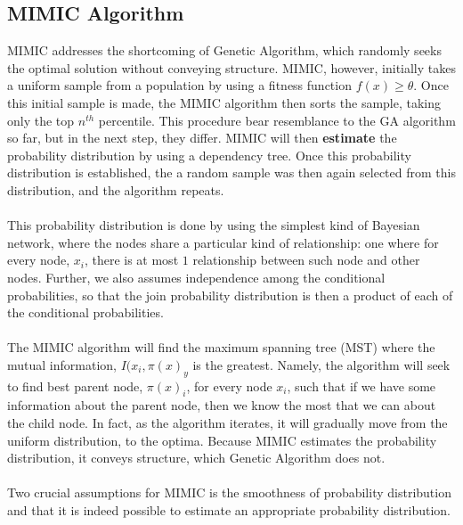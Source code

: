 \documentclass{article}
\begin{document}
\subsection*{MIMIC Algorithm}
MIMIC addresses the shortcoming of Genetic Algorithm, which randomly seeks the optimal solution without conveying structure. MIMIC, however, initially takes a uniform sample from a population by using a fitness function $f(x) \ge \theta$. Once this initial sample is made, the MIMIC algorithm then sorts the sample, taking only the top $n^{th}$ percentile. This procedure bear resemblance to the GA algorithm so far, but in the next step, they differ. MIMIC will then \textbf{estimate} the probability distribution by using a dependency tree. Once this probability distribution is established, the a random sample was then again selected from this distribution, and the algorithm repeats. 

\paragraph{}
This probability distribution is done by using the simplest kind of Bayesian network, where the nodes share a particular kind of relationship: one where for every node, $x_i$, there is at most $1$ relationship between such node and other nodes. Further, we also assumes independence among the conditional probabilities, so that the join probability distribution is then a product of each of the conditional probabilities. 

\paragraph{}
The MIMIC algorithm will find the maximum spanning tree (MST) where the mutual information, $I(x_i, \pi(x)_y$ is the greatest. Namely, the algorithm will seek to find best parent node, $\pi(x)_i$, for every node $x_i$, such that if we have some information about the parent node, then we know the most that we can about the child node. In fact, as the algorithm iterates, it will gradually move from the uniform distribution, to the optima. Because MIMIC estimates the probability distribution, it conveys structure, which Genetic Algorithm does not.

\paragraph{}
Two crucial assumptions for MIMIC is the smoothness of probability distribution and that it is indeed possible to estimate an appropriate probability distribution.
\end{document}
